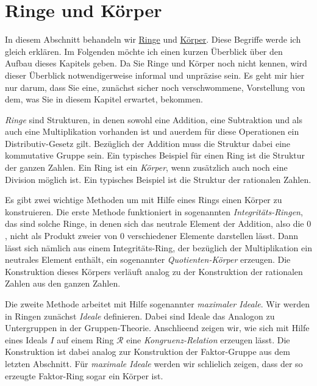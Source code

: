 \chapter{Ringe und K\"{o}rper}
In diesem Abschnitt behandeln wir 
\href{http://de.wikipedia.org/wiki/Ring_(Algebra)}{Ringe} und 
\href{http://en.wikipedia.org/wiki/Field_(mathematics)}{K\"{o}rper}.  Diese Begriffe werde ich gleich erkl\"{a}ren.
Im Folgenden m\"{o}chte ich einen kurzen \"{U}berblick \"{u}ber den Aufbau dieses Kapitels geben.  Da Sie Ringe und
K\"{o}rper  noch nicht kennen, wird dieser \"{U}berblick notwendigerweise informal und
unpr\"{a}zise sein.  Es geht mir hier nur darum, dass Sie eine, zun\"{a}chst sicher noch verschwommene, Vorstellung
von dem, was Sie in diesem Kapitel erwartet, bekommen.

\emph{\color{blue}Ringe} sind Strukturen, in denen
sowohl eine Addition, eine Subtraktion und als auch eine Multiplikation vorhanden ist und au\3erdem f\"{u}r diese
Operationen ein Distributiv-Gesetz gilt.  Bez\"{u}glich der Addition muss die Struktur dabei eine kommutative
Gruppe sein. Ein typisches Beispiel f\"{u}r einen Ring ist die Struktur der ganzen
Zahlen. Ein Ring ist ein \emph{\color{blue}K\"{o}rper}, wenn zus\"{a}tzlich auch noch eine Division m\"{o}glich ist.
Ein typisches Beispiel ist die Struktur der rationalen Zahlen.

Es gibt zwei wichtige Methoden um mit Hilfe eines Rings einen K\"{o}rper zu konstruieren.
Die erste Methode funktioniert in sogenannten \emph{\color{blue}Integrit\"{a}ts-Ringen}, das sind
solche Ringe, in denen sich das neutrale Element der Addition, also die $0$, nicht als Produkt
zweier von $0$ verschiedener Elemente darstellen l\"{a}sst.  Dann l\"{a}sst sich n\"{a}mlich aus
einem Integrit\"{a}ts-Ring, der bez\"{u}glich der Multiplikation ein 
neutrales Element enth\"{a}lt, ein sogenannter \emph{\color{blue}Quotienten-K\"{o}rper} erzeugen.
Die Konstruktion dieses K\"{o}rpers 
verl\"{a}uft analog zu der Konstruktion der rationalen Zahlen aus den ganzen Zahlen.

Die zweite Methode arbeitet mit Hilfe sogenannter \emph{\color{blue}maximaler Ideale}.  Wir
werden in Ringen zun\"{a}chst  
\emph{\color{blue}Ideale} definieren.  Dabei sind Ideale das Analogon zu Untergruppen in der Gruppen-Theorie.
Anschlie\3end zeigen wir, wie sich mit Hilfe eines Ideals $I$ auf einem Ring $\mathcal{R}$ eine
\emph{\color{blue}Kongruenz-Relation} 
erzeugen l\"{a}sst.  Die Konstruktion ist dabei analog zur Konstruktion der
Faktor-Gruppe aus dem letzten Abschnitt.  F\"{u}r \emph{\color{blue}maximale Ideale} werden wir schlie\3lich zeigen,
dass der so erzeugte Faktor-Ring sogar ein K\"{o}rper ist.

